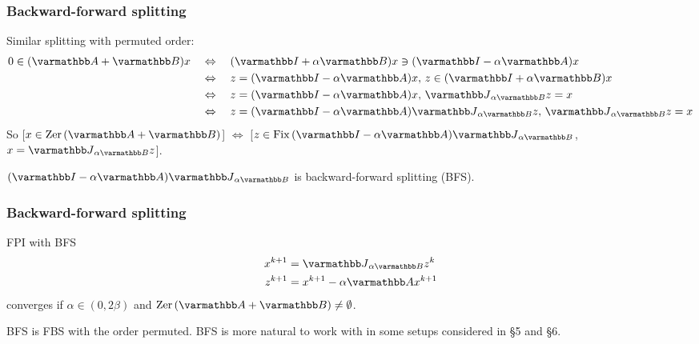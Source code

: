 \documentclass[10pt,mathserif]{beamer}
\begin{document}
\begin{frame}
\frametitle{Backward-forward splitting}
Similar splitting with permuted order:
\begin{align*}
0\in (\opA+\opB )x
\quad&\Leftrightarrow\quad
(\opI+\alpha \opB )x\ni (\opI-\alpha \opA)x\\
\quad&\Leftrightarrow\quad
z= (\opI-\alpha \opA)x,\,z\in (\opI+\alpha \opB )x\\
\quad&\Leftrightarrow\quad
z= (\opI-\alpha \opA)x,\,\opJ_{\alpha \opB }z= x\\
\quad&\Leftrightarrow\quad
z= (\opI-\alpha \opA)\opJ_{\alpha \opB }z,\,\opJ_{\alpha \opB }z= x
\end{align*}
So [$x\in\zer(\opA+\opB)$] $\Leftrightarrow$ [$z\in \fix(\opI-\alpha \opA)\opJ_{\alpha \opB }$, $x=\opJ_{\alpha \opB }z$].

\vspace{0.2in}
$(\opI-\alpha \opA)\opJ_{\alpha \opB }$ is backward-forward splitting (BFS).
\end{frame}




\begin{frame}
\frametitle{Backward-forward splitting}
FPI with BFS
\begin{align*}
x^{k+1} &= \opJ_{\alpha \opB }z^k\\
z^{k+1} &= x^{k+1}-\alpha \opA x^{k+1}
\end{align*}
converges if $\alpha\in (0,2\beta)$ and $\zer(\opA+\opB )\ne\emptyset$.

\vspace{0.2in}

BFS is FBS with the order permuted. BFS is more natural to work with in some setups considered in \S5 and \S6.
\end{frame}
\end{document}
